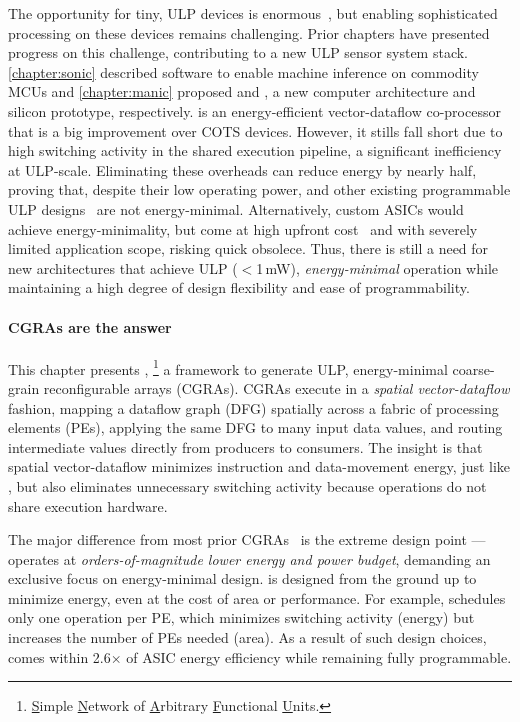 The opportunity for tiny, ULP devices is enormous~\cite{lucia2017intermittent}, but enabling sophisticated processing on these devices remains challenging.
% 
Prior chapters have presented progress on this challenge, contributing to a new ULP sensor system stack.
% 
\autoref{chapter:sonic} described software to enable machine inference on commodity MCUs and \autoref{chapter:manic} proposed \manic and \msilicon, a new computer architecture and silicon prototype, respectively.
% 
\manic is an energy-efficient vector-dataflow co-processor that is a big improvement over COTS devices.
% 
However, it stills fall short due to high switching activity
in the shared execution pipeline, a significant inefficiency at ULP-scale.
% 
Eliminating these overheads can reduce energy by nearly half, proving that, despite their low operating power, \manic and other existing programmable ULP designs~\cite{dally:ieee08:elm,hempstead2005ultra,warneke200417,nazhandali2005energy} are not energy-minimal.
% 
Alternatively, custom ASICs would achieve energy-minimality, but come at high upfront cost~\cite{hotmobile2021} and with severely limited application scope, risking quick obsolece.
% 
Thus, there is still a need for new architectures that achieve ULP ($<$1\,mW), \emph{energy-minimal} operation while maintaining a high degree of design flexibility and ease of programmability.

\paragraph{\Ulp CGRAs are the answer}
%
This chapter presents \snafuframe,%
\footnote{\underline{S}imple \underline{N}etwork of \underline{A}rbitrary \underline{F}unctional \underline{U}nits.}
a framework to generate ULP, energy-minimal coarse-grain reconfigurable arrays (CGRAs).
%
\snafuframe CGRAs execute in a \emph{spatial vector-dataflow} fashion,
mapping a dataflow graph (DFG) spatially across a fabric of processing elements (PEs),
applying the same DFG to many input data values,
and routing intermediate values directly from producers to consumers.
%
The insight is that spatial vector-dataflow minimizes instruction and data-movement energy, just like \manic,
but also eliminates unnecessary switching activity because operations do not share execution hardware.

The major difference from most prior CGRAs~\cite{plasticine,dyser,nowatzki:isca17:stream-dataflow,goldstein2000piperench,trips,weng2020dsagen,weng2020hybrid,voitsechov2014single,mishra2006tartan,tan2018stitch,karunaratne2017hycube,voitsechov2018inter,evx} is the extreme design point
--- \snafuframe operates at \emph{orders-of-magnitude lower energy and power budget},
demanding an exclusive focus on energy-minimal design.
%
\snafuframe is designed from the ground up to minimize energy, even at
the cost of area or performance.
%
For example, \snafuframe schedules only one operation per PE, which
minimizes switching activity (energy) but increases the number of PEs needed (area).
%
As a result of such design choices, \snafuframe comes within 2.6$\times$
of ASIC energy efficiency while remaining fully programmable.
%


